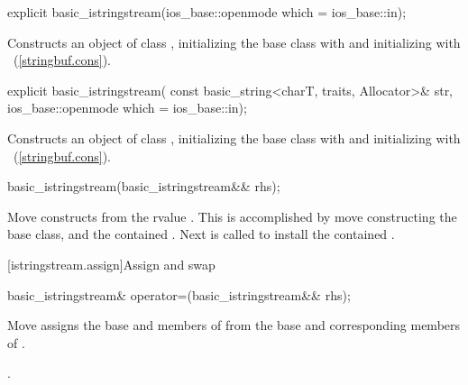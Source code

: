 %
\begin{itemdecl}
explicit basic_istringstream(ios_base::openmode which = ios_base::in);
\end{itemdecl}

\begin{itemdescr}
\pnum
\effects
Constructs an object of class
,
initializing the base class with
and initializing  with
~(\ref{stringbuf.cons}).
\end{itemdescr}

%
\begin{itemdecl}
explicit basic_istringstream(
  const basic_string<charT, traits, Allocator>& str,
  ios_base::openmode which = ios_base::in);
\end{itemdecl}

\begin{itemdescr}
\pnum
\effects
Constructs an object of class
,
initializing the base class with
and initializing  with
~(\ref{stringbuf.cons}).
\end{itemdescr}

%
\begin{itemdecl}
basic_istringstream(basic_istringstream&& rhs);
\end{itemdecl}

\begin{itemdescr}
\pnum
\effects Move constructs from the rvalue . This
is accomplished by move constructing the base class, and the contained
.
Next  is called to
install the contained .
\end{itemdescr}

[istringstream.assign]{Assign and swap}

%
\begin{itemdecl}
basic_istringstream& operator=(basic_istringstream&& rhs);
\end{itemdecl}

\begin{itemdescr}
\pnum
\effects Move assigns the base and members of  from the base and corresponding
members of .

\pnum
\returns {}.
\end{itemdescr}

